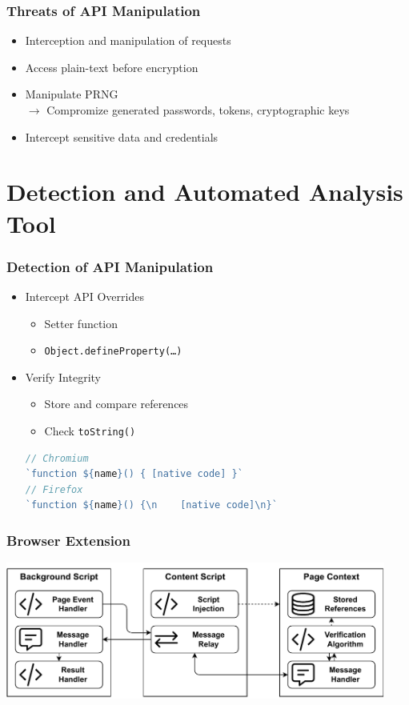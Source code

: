 \documentclass[t,aspectratio=169]{beamer}
\begin{document}
\begin{frame}
	\frametitle{Threats of API Manipulation}
	\begin{itemize}
		\item Interception and manipulation of requests
		\item Access plain-text before encryption
		\item Manipulate PRNG\\
		$\rightarrow$ Compromize generated passwords, tokens, cryptographic keys
		\item Intercept sensitive data and credentials
	\end{itemize}
\end{frame}

\section{Detection and Automated Analysis Tool}

\begin{frame}[fragile]
	\frametitle{Detection of API Manipulation}
	\begin{itemize}
		\item Intercept API Overrides
		\begin{itemize}
			\item Setter function
			\item \texttt{Object.defineProperty(…)}
		\end{itemize}
		\item Verify Integrity
		\begin{itemize}
			\item Store and compare references
			\item Check \texttt{toString()}
		\end{itemize}
\begin{overprint}
		\begin{lstlisting}[language=JavaScript,numbers=none,showstringspaces=true]
// Chromium
`function ${name}() { [native code] }`
// Firefox
`function ${name}() {\n    [native code]\n}`
		\end{lstlisting}
\end{overprint}
	\end{itemize}
\end{frame}

\begin{frame}
	\frametitle{Browser Extension} %
	\begin{center}
		\includegraphics[height=4.5cm]{img/context-diagram.pdf}
	\end{center}
\end{frame}
\end{document}
